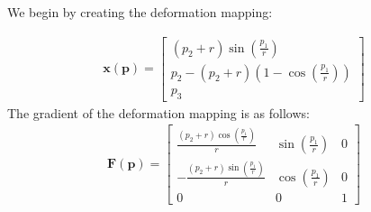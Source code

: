 \begin{problem}
    \noindent
    \normalfont

    We begin by creating the deformation mapping:

    \begin{align}
        \mathbf{x}(\mathbf{p})=\begin{bmatrix}
        (p_{2}+r)\sin\left( \frac{p_{1}}{r} \right) \\
        p_{2}-(p_{2}+r)\left( 1-\cos\left( \frac{p_{1}}{r} \right) \right) \\
        p_{3}
        \end{bmatrix} \label{deform}
        \end{align}
        The gradient of the deformation mapping is as follows:
        \begin{align}
            \mathbf{F}(\mathbf{p})=\begin{bmatrix}
            \frac{(p_{2}+r)\cos\left( \frac{p_{1}}{r} \right)}{r} & \sin\left( \frac{p_{1}}{r} \right) & 0 \\
            -\frac{(p_{2}+r)\sin\left( \frac{p_{1}}{r} \right)}{r} & \cos\left( \frac{p_{1}}{r} \right) & 0 \\
            0 & 0 & 1
            \end{bmatrix}
            \end{align}
\end{problem}